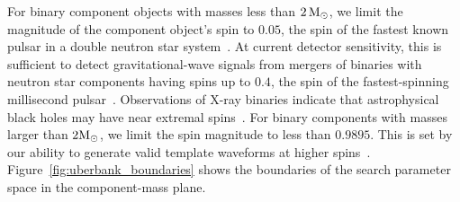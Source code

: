 For binary component objects with masses less than $2\,\mathrm{M}_\odot$, we limit the
magnitude of the component object's spin to $0.05$, the spin of the fastest
known pulsar in a double neutron star system~\cite{Burgay:2003jj}. At current
detector sensitivity, this is sufficient to detect gravitational-wave signals
from mergers of binaries with neutron star components having spins up to
$0.4$, the spin of the fastest-spinning millisecond
pulsar~\cite{Lorimer:2008se}.  Observations of X-ray binaries indicate that
astrophysical black holes may have near extremal
spins~\cite{McClintock:2013vwa}. For binary components with masses larger than
$2 \mathrm{M}_\odot$, we limit the spin magnitude to less than $0.9895$.  This is set by
our ability to generate valid template waveforms at higher
spins~\cite{Taracchini:2013rva}.  Figure~\ref{fig:uberbank_boundaries} shows the
boundaries of the search parameter space in the component-mass plane.
 

